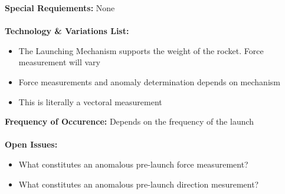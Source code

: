 \documentclass[letterpaper]{article}
\begin{document}
\textbf{Special Requiements:  }None\\\\
\textbf{Technology \& Variations List:  }
\begin{itemize}
\item The Launching Mechanism supports the weight of the rocket. Force
measurement will vary
\item Force measurements and anomaly determination depends on mechanism
\item This is literally a vectoral measurement
\end{itemize}
\textbf{Frequency of Occurence: }Depends on the frequency of the
launch\\\\
\textbf{Open Issues:  }
\begin{itemize}
\item What constitutes an anomalous pre-launch force measurement?
\item What constitutes an anomalous pre-launch direction mesurement?
\end{itemize}
\end{document}
